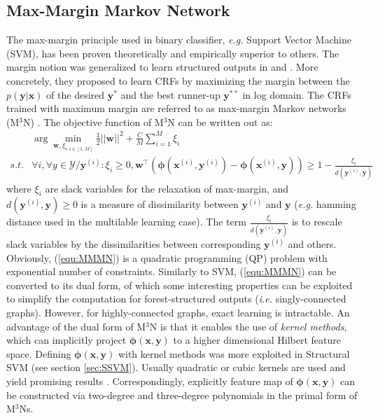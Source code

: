 \subsection{Max-Margin Markov Network}
\label{subsec:MMMN}
The max-margin principle used in binary classifier, \emph{e.g.} Support Vector Machine (SVM), has been proven theoretically and empirically \citep{Vapnik} superior to others.        
The margin notion was generalized to learn structured outputs in \citep{Taskar03} and \citep{StructSVM}. More concretely, they proposed to learn CRFs by maximizing the margin 
between the $p(\mathbf{y|x})$ of the desired $\mathbf{y^*}$ and the best runner-up $\mathbf{y}^{**}$ in log domain. The CRFs trained with maximum margin are referred to as 
max-margin Markov networks (M$^3$N) \citep{Taskar03}.  The objective function of M$^3$N can be written out as: 
\begin{equation}
    \begin{array}{rl}
        & \arg\min_{\mathbf{w},\xi_{i:i\in[1,M]}}  \frac{1}{2} ||\mathbf{w}||^2 +\frac{C}{M} \sum_{i=1}^M \xi_i \\
   s.t. &\forall i, \forall y\in\mathcal{Y}/\mathbf{y}^{(i)}: \xi_i\geq0, \mathbf{w}^\top (\boldsymbol{\phi}(\mathbf{x}^{(i)},\mathbf{y}^{(i)})-\boldsymbol{\phi} 
        (\mathbf{x}^{(i)},\mathbf{y}))\geq 1-\frac{\xi_i}{d(\mathbf{y}^{(i)},\mathbf{y})}
    \end{array}
    \label{equ:MMMN}
\end{equation}
where $\xi_i$ are slack variables for the relaxation of 
max-margin, and $d(\mathbf{y}^{(i)},\mathbf{y})\geq0$ is a measure of dissimilarity between $\mathbf{y}^{(i)}$ and $\mathbf{y}$ 
(\emph{e.g.} hamming distance used in the multilable learning case). The term $\frac{\xi_i}{d(\mathbf{y}^{(i)},\mathbf{y})}$ is to rescale 
slack variables by the dissimilarities between corresponding $\mathbf{y}^{(i)}$ and others. 
Obviously, (\ref{equ:MMMN}) is a quadratic programming (QP)  problem with exponential number of 
constraints. Similarly to SVM, (\ref{equ:MMMN}) can be converted to its dual form, of which some interesting properties can be exploited 
to simplify the computation 
for forest-structured outputs (\emph{i.e.} singly-connected graphs). However, for highly-connected graphs, exact learning is intractable.  
An advantage of the dual form of M$^3$N is that it enables the use of \emph{kernel methods}, which can implicitly project 
$\boldsymbol{\phi}(\mathbf{x},\mathbf{y})$ to 
a higher dimensional Hilbert feature space. Defining $\boldsymbol{\phi}(\mathbf{x},\mathbf{y})$  with kernel methods was more exploited in Structural SVM \citep{StructSVM} (see section \ref{sec:SSVM}). 
Usually quadratic or cubic kernels are used and yield promising results \citep{Taskar03}. 
Correspondingly, 
explicitly feature map of $\boldsymbol{\phi}(\mathbf{x},\mathbf{y})$  can be constructed via two-degree and three-degree polynomials in the primal form of M$^3$Ns.  

